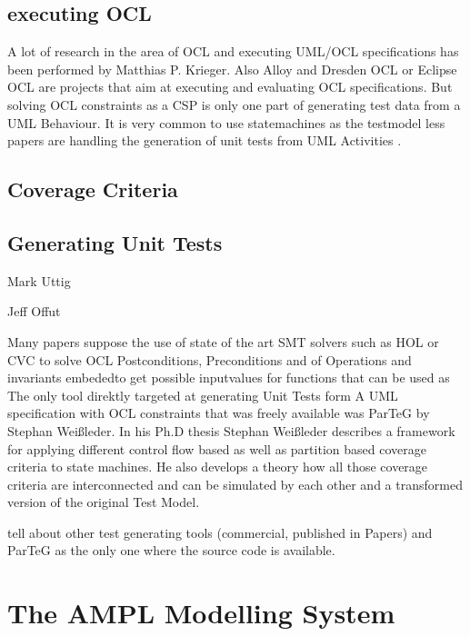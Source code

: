 \subsection{executing OCL}
A lot of research in the area of OCL and executing UML/OCL specifications has been performed by Matthias P. Krieger\cite{krieger2008executing}. Also Alloy and Dresden OCL or Eclipse OCL are projects that aim at executing and evaluating OCL specifications. But solving OCL constraints as a CSP is only one part of generating test data from a UML Behaviour.
It is very common to use statemachines as the testmodel less papers are handling the generation of unit tests from UML Activities\cite{Linzhang04GeneratingTestCasefromActivityGrayBoxMethod}
\cite{Patel12TestCaseFormationUsigUMLActivityDiagram}
\cite{Pechtanun12GeneratingTestCaseFromUMLActivityDiagramBasedOnACGrammar}
\cite{Xu09ModelCheckingUMLActivities}\cite{Xu09ModelCheckingUMLActivityDiagramsFDR}. 


\subsection{Coverage Criteria}


\subsection{Generating Unit Tests}
Mark Uttig

Jeff Offut

Many papers suppose the use of state of the art SMT solvers such as HOL or CVC to solve OCL Postconditions, Preconditions and  of Operations and invariants embededto get possible inputvalues for functions that can be used as 
The only tool direktly targeted at generating Unit Tests form A UML specification with OCL constraints that was freely available was ParTeG by Stephan Weißleder. In his Ph.D thesis Stephan Weißleder describes a framework for applying different control flow based as well as partition based coverage criteria to state machines. He also develops a theory how all those coverage criteria are interconnected and can be simulated by each other and a transformed version of the original Test Model\cite{ParTeG}.


tell about other test generating tools (commercial, published in Papers) and ParTeG as the only one where the source code is available.\cite{ParTeG}

\section{The AMPL Modelling System}
\cite{AMPL}
